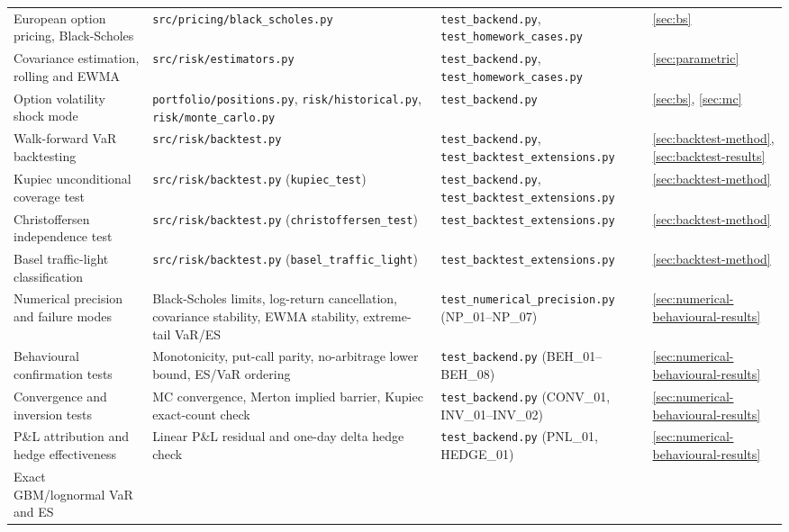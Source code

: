 \documentclass[11pt]{article}
\newcommand{\code}[1]{\texttt{#1}}
\begin{document}
\begin{center}
\begin{longtable}{L{3.0cm}L{4.5cm}L{4.2cm}L{2.0cm}}
European option pricing, Black-Scholes
  & \code{src/pricing/black\_scholes.py}
  & \code{test\_backend.py}, \code{test\_homework\_cases.py}
  & \ref{sec:bs} \\[4pt]
Covariance estimation, rolling and EWMA
  & \code{src/risk/estimators.py}
  & \code{test\_backend.py}, \code{test\_homework\_cases.py}
  & \ref{sec:parametric} \\[4pt]
Option volatility shock mode
  & \code{portfolio/positions.py}, \code{risk/historical.py},
    \code{risk/monte\_carlo.py}
  & \code{test\_backend.py}
  & \ref{sec:bs}, \ref{sec:mc} \\[4pt]
Walk-forward VaR backtesting
  & \code{src/risk/backtest.py}
  & \code{test\_backend.py}, \code{test\_backtest\_extensions.py}
  & \ref{sec:backtest-method}, \ref{sec:backtest-results} \\[4pt]
Kupiec unconditional coverage test
  & \code{src/risk/backtest.py} (\code{kupiec\_test})
  & \code{test\_backend.py}, \code{test\_backtest\_extensions.py}
  & \ref{sec:backtest-method} \\[4pt]
Christoffersen independence test
  & \code{src/risk/backtest.py} (\code{christoffersen\_test})
  & \code{test\_backtest\_extensions.py}
  & \ref{sec:backtest-method} \\[4pt]
Basel traffic-light classification
  & \code{src/risk/backtest.py} (\code{basel\_traffic\_light})
  & \code{test\_backtest\_extensions.py}
  & \ref{sec:backtest-method} \\[4pt]
Numerical precision and failure modes
  & Black-Scholes limits, log-return cancellation, covariance stability, EWMA stability, extreme-tail VaR/ES
  & \code{test\_numerical\_precision.py} (NP\_01--NP\_07)
  & \ref{sec:numerical-behavioural-results} \\[4pt]
Behavioural confirmation tests
  & Monotonicity, put-call parity, no-arbitrage lower bound, ES/VaR ordering
  & \code{test\_backend.py} (BEH\_01--BEH\_08)
  & \ref{sec:numerical-behavioural-results} \\[4pt]
Convergence and inversion tests
  & MC convergence, Merton implied barrier, Kupiec exact-count check
  & \code{test\_backend.py} (CONV\_01, INV\_01--INV\_02)
  & \ref{sec:numerical-behavioural-results} \\[4pt]
P\&L attribution and hedge effectiveness
  & Linear P\&L residual and one-day delta hedge check
  & \code{test\_backend.py} (PNL\_01, HEDGE\_01)
  & \ref{sec:numerical-behavioural-results} \\[4pt]
Exact GBM/lognormal VaR and ES

\end{longtable}
\end{center}
\end{document}
